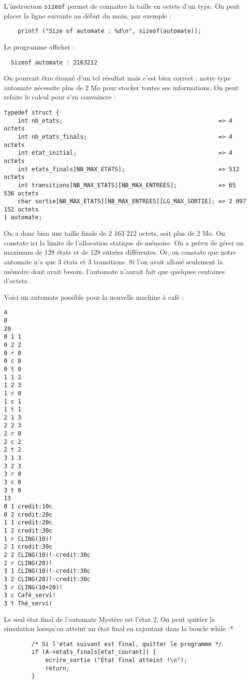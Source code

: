 \documentclass[10pt]{article}
\begin{document}
\begin{enumerate}[label=\textbf{[\alph*]}]
\item L'instruction \texttt{sizeof} permet de connaitre la taille en
  octets d'un type. On peut placer la ligne suivante au début du main,
  par exemple :

  \begin{lstlisting}
	printf ("Size of automate : %d\n", sizeof(automate));
  \end{lstlisting}

  Le programme afficher :
\begin{verbatim}
  Sizeof automate : 2163212
\end{verbatim}

On pourrait être étonné d'un tel résultat mais c'est bien correct :
notre type automate nécessite plus de 2 Mo pour stocker toutes ses
informations. On peut refaire le calcul pour s'en convaincre :

\begin{verbatim}
typedef struct {
    int nb_etats;                                             => 4 octets
    int nb_etats_finals;                                      => 4 octets
    int etat_initial;                                         => 4 octets
    int etats_finals[NB_MAX_ETATS];                           => 512 octets
    int transitions[NB_MAX_ETATS][NB_MAX_ENTREES];            => 65 536 octets
    char sortie[NB_MAX_ETATS][NB_MAX_ENTREES][LG_MAX_SORTIE]; => 2 097 152 octets
} automate;
\end{verbatim}

On a donc bien une taille finale de 2 163 212 octets, soit plus de 2
Mo. On constate ici la limite de l'allocation statique de mémoire. On
a prévu de gérer un maximum de 128 états et de 128 entrées
différentes. Or, on constate que notre automate n'a que 3 états et 3
transitions. Si l'on avait alloué seulement la mémoire dont avait
besoin, l'automate n'aurait fait que quelques centaines d'octets.

\item Voici un automate possible pour la nouvelle machine à café :

\begin{verbatim}
4
0
20
0 1 1
0 2 2
0 r 0
0 c 0
0 t 0
1 1 2
1 2 3
1 r 0
1 c 1
1 t 1
2 1 3
2 2 3
2 r 0
2 c 2
2 t 2
3 1 3
3 2 3
3 r 0
3 c 0
3 t 0
13
0 1 credit:10c
0 2 credit:20c
1 1 credit:20c
1 2 credit:30c
1 r CLING(10)!
2 1 credit:30c
2 2 CLING(10)!-credit:30c
2 r CLING(20)!
3 1 CLING(10)!-credit:30c
3 2 CLING(20)!-credit:30c
3 r CLING(10+20)!
3 c Café_servi!
3 t Thé_servi!
\end{verbatim}

\newpage

\item Le seul état final de l'automate Mystère est l'état 2. On peut
  quitter la simulation lorsqu'on atteint un état final en rajoutant
  dans la boucle while :*

  \begin{lstlisting}
		/* Si l'état suivant est final, quitter le programme */
		if (A->etats_finals[etat_courant]) {
			ecrire_sortie ("État final atteint !\n");
			return;
		}
  \end{lstlisting}

\end{enumerate}
\end{document}
